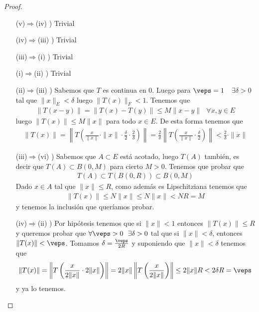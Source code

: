 \begin{observacion}
    \begin{proof}\ 
        \begin{itemize}
            \item[(v)$\Rightarrow$(iv) )] Trivial
            \item[(iv)$\Rightarrow$(iii) )] Trivial
            \item[(iii)$\Rightarrow$(i) )] Trivial
            \item[(i)$\Rightarrow$(ii) )] Trivial
            \item[(ii)$\Rightarrow$(iii) )] Sabemos que $T$ es continua en $0$. Luego para $\veps = 1$\ \ $\exists \delta>0$ tal que $\|x\|_E<\delta$ luego $\|T(x)\|_F<1$. Tenemos que
            \begin{gather*}
                \|T(x-y)\| = \|T(x)-T(y)\| \leq M\|x-y\| \ \ \ \forall x,y \in E
            \end{gather*}
            luego $\|T(x)\| \leq M\|x\|$ para todo $x\in E$. De esta forma tenemos que 
            \begin{gather*}
                \|T(x)\| = \left\| T \left(\frac{x}{\|x\|} \cdot \|x\| \cdot \frac{\delta}{2} \cdot \frac{2}{\delta}\right) \right\| = \frac{2}{\delta}\left\| T\left(\frac{x}{\|x\|} \cdot\frac{\delta}{2} \right) \right\| < \frac{2}{\delta}\cdot \|x\|
            \end{gather*}
            \item [(iii)$\Rightarrow$(vi) )] Sabemos que $A\subset E$ está acotado, luego $T(A)$ también, es decir que $T(A)\subset B(0,M)$ para cierto $M>0$. Tenemos que probar que
            \begin{gather*}
                T(A) \subset T(B(0,R))\subset B(0,M)
            \end{gather*}
            Dado $x\in A$ tal que $\|x\|\leq R$, como además es Lipschitziana tenemos que 
            \begin{gather*}
                \|T(x)\| \leq N\|x\| \leq N \|x\| < NR = M
            \end{gather*}
            y tenemos la inclusión que queríamos probar.
            \item [(iv)$\Rightarrow$(ii) )] Por hipótesis tenemos que si $\|x\|<1$ entonces $\|T(x)\|\leq R$ y queremos probar que $\forall \veps >0 \ \ \exists \delta>0$ tal que si $\|x\|<\delta$, entonces $\|T(x)\|<\veps$. Tomamos $\delta = \frac{\veps}{2R}$ y suponiendo que $\|x\|<\delta$ tenemos que
            \begin{gather*}
                \|T(x)\| = \left\|T\left(\frac{x}{2\|x\|}\cdot 2 \|x\|\right)\right\| = 2\|x\| \left\|T\left(\frac{x}{2\|x\|}\right)\right\| \leq 2\|x\|R < 2\delta R = \veps
            \end{gather*}
            y ya lo tenemos.
        \end{itemize}
    \end{proof}
\end{observacion}

